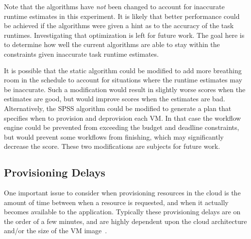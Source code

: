 \documentclass[preprint,5p]{elsarticle}
\begin{document}
Note that the algorithms have \textit{not} been changed to account for
inaccurate runtime estimates in this experiment. It is likely that better
performance could be achieved if the algorithms were given a hint as to the
accuracy of the task runtimes. Investigating that optimization is left for
future work. 
The goal here is to determine how well the current algorithms are
able to stay within the constraints given inaccurate task runtime estimates.

It is possible that the static algorithm could be modified to add more
breathing room in the schedule to account for situations where the runtime
estimates may be inaccurate. Such a modification would result in slightly
worse scores when the estimates are good, but would improve scores when the
estimates are bad. Alternatively, the SPSS algorithm could be modified to
generate a plan that specifies when to provision and deprovision each VM. In
that case the workflow engine could be prevented from exceeding the budget
and deadline constraints, but would prevent some workflows from finishing,
which may significantly decrease the score. These two modifications are
subjects for future work.


\subsection{Provisioning Delays}
\label{sec:delays}

One important issue to consider when provisioning resources in the cloud is
the amount of time between when a resource is requested, and when it actually
becomes available to the application. Typically these provisioning delays are
on the order of a few minutes, and are highly dependent upon the cloud architecture
and/or the size of the VM image~\cite{Nurmi2008b}.
\end{document}
